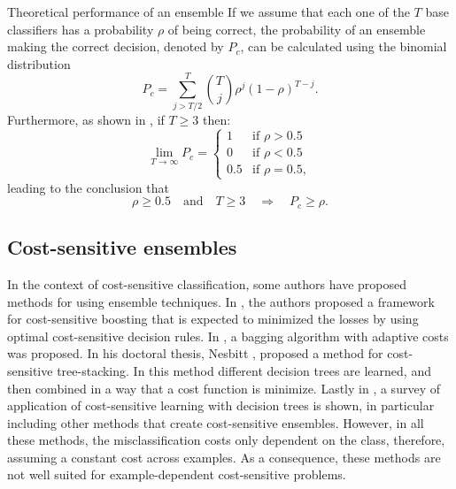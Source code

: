 {  \begin{remark}{Theoretical performance of an ensemble}
  If we assume that each one of the $T$ base classifiers has a probability $\rho$ of 
  being correct, the probability of an ensemble making the correct decision, denoted by $P_c$,
  can be calculated using the binomial \mbox{distribution \citep{Hansen1990}}
  \begin{equation}\label{eq:9:prob}
    P_c = \sum_{j>T/2}^{T} {{T}\choose{j}} \rho^j(1-\rho)^{T-j}.
  \end{equation}
  Furthermore, as shown in \cite{Lam1997}, if $T\ge3$ then:
  \begin{equation}\label{eq:9:Pc}
  \lim_{T \to  \infty} P_c= \begin{cases} 
            1  &\mbox{if } \rho>0.5 \\ 
            0  &\mbox{if } \rho<0.5 \\ 
            0.5  &\mbox{if } \rho=0.5 ,
            \end{cases}
  \end{equation}
	leading to the conclusion that 
	\begin{equation}\label{eq:9:Pc2}
  \rho \ge 0.5 \quad \text{and} \quad T\ge3 \quad \Rightarrow \quad P_c\ge \rho.
  \end{equation}
  \end{remark}
  
\subsection{Cost-sensitive ensembles}

  In the context of cost-sensitive classification, some authors have proposed methods for using 
  ensemble techniques. In \citep{Masnadi-shirazi2011}, the authors proposed a framework for 
  cost-sensitive boosting that is expected to minimized the losses by using optimal cost-sensitive 
  decision rules. In \citep{Street2008}, a bagging algorithm with adaptive costs was proposed. In 
  his doctoral thesis, Nesbitt \citep{Nesbitt2010}, proposed a method for cost-sensitive 
  tree-stacking. In this method different decision trees are learned, and then combined in a way 
  that a cost function is minimize. Lastly in \citep{Lomax2013}, a survey of application of 
  cost-sensitive learning with decision trees is shown, in particular including other methods that 
  create cost-sensitive ensembles. However, in all these methods, the  misclassification costs only 
  dependent on the class, therefore, assuming a constant cost across  examples. As a consequence, 
  these methods are not  well suited for example-dependent cost-sensitive  problems. 

}
